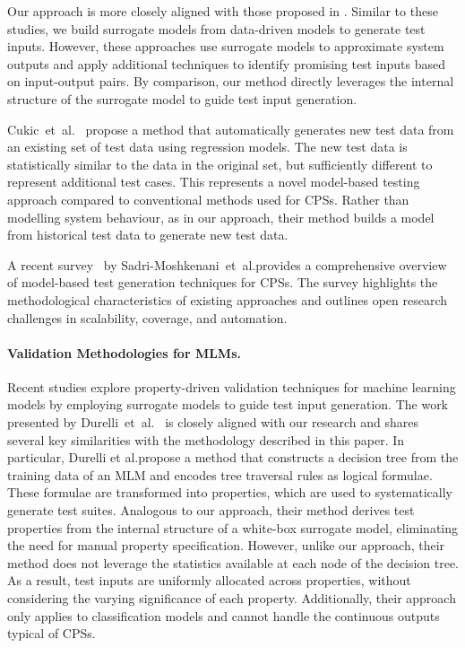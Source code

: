 \documentclass[
]{ceurart}
\theoremstyle{definition}
\begin{document}
Our approach is more closely aligned with those proposed in \cite{deshmukh, menghi, kosek}. Similar to these studies, we build surrogate models from data-driven models to generate test inputs. However, these approaches use surrogate models to approximate system outputs and apply additional techniques to identify promising test inputs based on input-output pairs. By comparison, our method directly leverages the internal structure of the surrogate model to guide test input generation.

Cukic~et~al.~\cite{cukic} propose a method that automatically generates new test data from an existing set of test data using regression models. The new test data is statistically similar to the data in the original set, but sufficiently different to represent additional test cases. This represents a novel model-based testing approach compared to conventional methods used for CPSs. Rather than modelling system behaviour, as in our approach, their method builds a model from historical test data to generate new test data.

A recent survey~\cite{survey} by Sadri-Moshkenani~et~al.\@ provides a comprehensive overview of model-based test generation techniques for CPSs. The survey highlights the methodological characteristics of existing approaches and outlines open research challenges in scalability, coverage, and automation.

\paragraph{Validation Methodologies for MLMs.}

Recent studies explore property-driven validation techniques for machine learning models by employing surrogate models to guide test input generation. The work presented by Durelli~et~al.~\cite{durelli} is closely aligned with our research and shares several key similarities with the methodology described in this paper. In particular, Durelli et al.\@ propose a method that constructs a decision tree from the training data of an MLM and encodes tree traversal rules as logical formulae. These formulae are transformed into properties, which are used to systematically generate test suites. Analogous to our approach, their method derives test properties from the internal structure of a white-box surrogate model, eliminating the need for manual property specification. However, unlike our approach, their method does not leverage the statistics available at each node of the decision tree. As a result, test inputs are uniformly allocated across properties, without considering the varying significance of each property. Additionally, their approach only applies to classification models and cannot handle the continuous outputs typical of CPSs.
\end{document}
